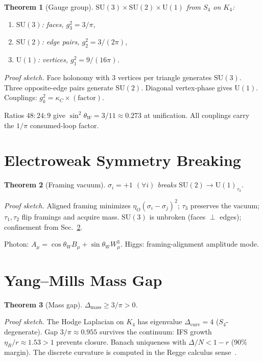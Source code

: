 \documentclass[11pt,twocolumn]{article}
\newtheorem{theorem}{Theorem}
\begin{document}
\begin{theorem}[Gauge group]
\label{thm:gauge}
$\mathrm{SU}(3){\times}\mathrm{SU}(2){\times}\mathrm{U}(1)$ from $S_4$ on $K_4$:
\begin{enumerate}[label=(\roman*),leftmargin=2em,itemsep=2pt]
\item $\mathrm{SU}(3)$: faces, $g_3^2=3/\pi$,
\item $\mathrm{SU}(2)$: edge pairs, $g_2^2=3/(2\pi)$,
\item $\mathrm{U}(1)$: vertices, $g_1^2=9/(16\pi)$.
\end{enumerate}
\end{theorem}
\textit{Proof sketch.}
Face holonomy with 3 vertices per triangle generates $\mathrm{SU}(3)$.
Three opposite-edge pairs generate $\mathrm{SU}(2)$.
Diagonal vertex-phase gives $\mathrm{U}(1)$.
Couplings: $g_k^2=\kappa_C\times(\text{factor})$.

Ratios $48:24:9$ give $\sin^2\theta_W=3/11\approx 0.273$ at unification.
All couplings carry the $1/\pi$ consumed-loop factor.

\section{Electroweak Symmetry Breaking}
\label{sec:ewsb}

\begin{theorem}[Framing vacuum]
\label{thm:ewsb}
$\sigma_i=+1$ $(\forall i)$ breaks $\mathrm{SU}(2)\to\mathrm{U}(1)_{\tau_3}$.
\end{theorem}
\textit{Proof sketch.}
Aligned framing minimizes $\eta_O(\sigma_i{-}\sigma_j)^2$; $\tau_3$ preserves the vacuum; $\tau_1,\tau_2$ flip framings and acquire mass.
$\mathrm{SU}(3)$ is unbroken (faces $\perp$ edges); confinement from Sec.~\ref{sec:massgap}.

Photon: $A_\mu=\cos\theta_W B_\mu+\sin\theta_W W^3_\mu$.
Higgs: framing-alignment amplitude mode.

\section{Yang--Mills Mass Gap}
\label{sec:massgap}

\begin{theorem}[Mass gap]
\label{thm:massgap}
$\Delta_{\mathrm{mass}}\geq 3/\pi>0$.
\end{theorem}
\textit{Proof sketch.}
The Hodge Laplacian on $K_4$ has eigenvalue $\Delta_{\mathrm{curv}}=4$ ($S_4$-degenerate).
Gap $3/\pi\approx 0.955$ survives the continuum: IFS growth $\eta_R/r\approx 1.53>1$ prevents closure.
Banach uniqueness with $\Delta/N<1-r$ (90\% margin).
The discrete curvature is computed in the Regge calculus sense~\cite{regge1961}.
\end{document}

